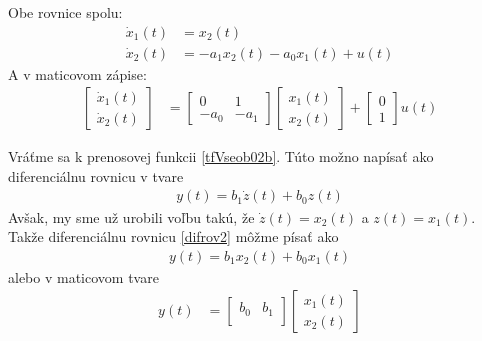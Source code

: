\documentclass[a4paper, 10pt, ]{article}
\begin{document}
Obe rovnice spolu:
\begin{align}
    \dot x_1(t) &= x_2(t) \\
	\dot x_2(t) &=  - a_1 x_2(t) - a_0 x_1(t) + u(t)
\end{align}
A v maticovom zápise:
\begin{align}
	\begin{bmatrix}
    	  \dot x_1(t) \\
		  \dot x_2(t)
 	\end{bmatrix}
	&=
	\begin{bmatrix}
    	0 & 1 \\
    	- a_0 & - a_1
  	\end{bmatrix}
    \begin{bmatrix}
    	  x_1(t) \\
		  x_2(t)
 	\end{bmatrix}
    +
    \begin{bmatrix}
    	  0 \\
		  1
 	\end{bmatrix}
    u(t)
\end{align}


Vráťme sa k prenosovej funkcii \eqref{tfVseob02b}. Túto možno napísať ako diferenciálnu rovnicu v tvare
\begin{align} \label{difrov2}
    y(t) = b_1 \dot z(t) + b_0 z(t)
\end{align}
Avšak, my sme už urobili voľbu takú, že $\dot z(t) = x_2(t)$ a $z(t)= x_1(t)$. Takže diferenciálnu rovnicu \eqref{difrov2} môžme písať ako
\begin{align}
    y(t) = b_1 x_2(t) + b_0 x_1(t)
\end{align}
alebo v maticovom tvare
\begin{align}
	y(t)
	&=
	\begin{bmatrix}
    	b_0 & b_1 \\
  	\end{bmatrix}
    \begin{bmatrix}
    	  x_1(t) \\
		  x_2(t)
 	\end{bmatrix}
\end{align}
\end{document}
